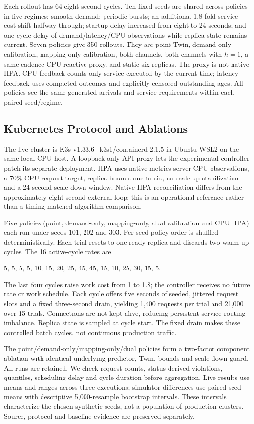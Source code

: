 \documentclass[11pt,a4paper]{article}
\begin{document}
Each rollout has 64 eight-second cycles. Ten fixed seeds are shared across policies in five regimes: smooth demand; periodic bursts; an additional 1.8-fold service-cost shift halfway through; startup delay increased from eight to 24 seconds; and one-cycle delay of demand/latency/CPU observations while replica state remains current. Seven policies give 350 rollouts. They are point Twin, demand-only calibration, mapping-only calibration, both channels, both channels with $h=1$, a same-cadence CPU-reactive proxy, and static six replicas. The proxy is not native HPA. CPU feedback counts only service executed by the current time; latency feedback uses completed outcomes and explicitly censored outstanding ages. All policies see the same generated arrivals and service requirements within each paired seed/regime.

\subsection{Kubernetes Protocol and Ablations}
The live cluster is K3s v1.33.6+k3s1/containerd 2.1.5 in Ubuntu WSL2 on the same local CPU host. A loopback-only API proxy lets the experimental controller patch its separate deployment. HPA uses native metrics-server CPU observations, a 70\% CPU-request target, replica bounds one to six, no scale-up stabilization and a 24-second scale-down window. Native HPA reconciliation differs from the approximately eight-second external loop; this is an operational reference rather than a timing-matched algorithm comparison.

Five policies (point, demand-only, mapping-only, dual calibration and CPU HPA) each run under seeds 101, 202 and 303. Per-seed policy order is shuffled deterministically. Each trial resets to one ready replica and discards two warm-up cycles. The 16 active-cycle rates are
\begin{center}\small 5, 5, 5, 5, 10, 15, 20, 25, 45, 45, 15, 10, 25, 30, 15, 5.\end{center}
The last four cycles raise work cost from 1 to 1.8; the controller receives no future rate or work schedule. Each cycle offers five seconds of seeded, jittered request slots and a fixed three-second drain, yielding 1,400 requests per trial and 21,000 over 15 trials. Connections are not kept alive, reducing persistent service-routing imbalance. Replica state is sampled at cycle start. The fixed drain makes these controlled batch cycles, not continuous production traffic.

The point/demand-only/mapping-only/dual policies form a two-factor component ablation with identical underlying predictor, Twin, bounds and scale-down guard. All runs are retained. We check request counts, status-derived violations, quantiles, scheduling delay and cycle duration before aggregation. Live results use means and ranges across three executions; simulator differences use paired seed means with descriptive 5,000-resample bootstrap intervals. These intervals characterize the chosen synthetic seeds, not a population of production clusters. Source, protocol and baseline evidence are preserved separately.
\end{document}
